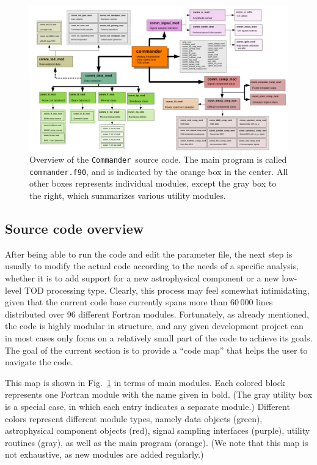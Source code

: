 \documentclass[twocolumn]{aa}
\def\commander{\texttt{Commander}}
\begin{document}
\begin{figure}[t]
  \center
  \includegraphics[width=\linewidth]{figs/commander_overview.pdf}
  \caption{Overview of the \commander\ source code. The main program
    is called \texttt{commander.f90}, and is indicated by the orange
    box in the center. All other boxes represents individual modules,
    except the gray box to the right, which summarizes various utility modules.
  }\label{fig:commander}
\end{figure}

\subsection{Source code overview}

After being able to run the code and edit the parameter file, the next
step is usually to modify the actual code according to the needs of a
specific analysis, whether it is to add support for a new
astrophysical component or a new low-level TOD processing
type. Clearly, this process may feel somewhat intimidating, given that
the current code base currently spans more than 60\,000 lines
distributed over 96 different Fortran modules. Fortunately, as already
mentioned, the code is highly modular in structure, and any given
development project can in most cases only focus on a relatively small
part of the code to achieve its goals. The goal of the current section
is to provide a ``code map'' that helps the user to navigate the code.

This map is shown in Fig.~\ref{fig:commander} in terms of main
modules. Each colored block represents one Fortran module with the
name given in bold. (The gray utility box is a special case, in which
each entry indicates a separate module.) Different colors represent
different module types, namely data objects (green), astrophysical
component objects (red), signal sampling interfaces (purple), utility
routines (gray), as well as the main program (orange). (We note that
this map is not exhaustive, as new modules are added regularly.)
\end{document}
